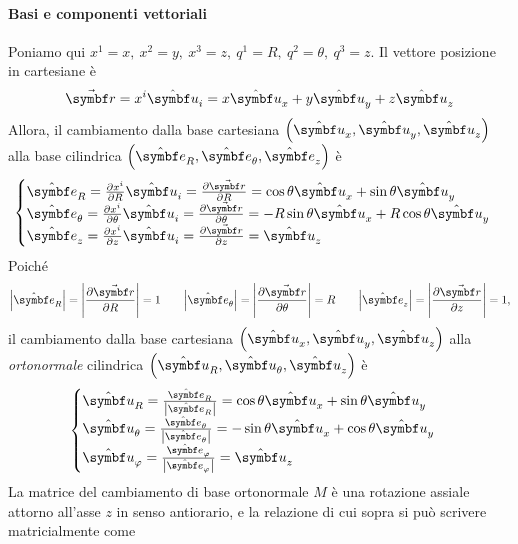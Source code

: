 \paragraph{Basi e componenti vettoriali}
Poniamo qui $x^1=x,\ x^2=y,\ x^3=z,\ q^1=R,\ q^2=\theta,\ q^3=z$.
Il vettore posizione in cartesiane è
\begin{equation*}
	\vba{r}=x^i\vbh{u}_i=x\vbh{u}_x+y\vbh{u}_y+z\vbh{u}_z
\end{equation*}
Allora, il cambiamento dalla base cartesiana $\left(\vbh{u}_x,\vbh{u}_y,\vbh{u}_z\right)$ alla base cilindrica $\left(\vbh{e}_R,\vbh{e}_\theta,\vbh{e}_z\right)$ è
\begin{equation}
	\begin{cases}
		\vbh{e}_R=\pdv{x^i}{R}\vbh{u}_i=\pdv{\vba{r}}{R}=\cos\theta\vbh{u}_x+\sin\theta\vbh{u}_y\\
		\vbh{e}_\theta=\pdv{x^i}{\theta}\vbh{u}_i=\pdv{\vba{r}}{\theta}=-R\sin\theta\vbh{u}_x+R\cos\theta\vbh{u}_y\\
		\vbh{e}_z=\pdv{x^i}{z}\vbh{u}_i=\pdv{\vba{r}}{z}=\vbh{u}_z
	\end{cases}
\end{equation}
Poiché
\begin{equation}
	\abs{\vbh{e}_R}=\abs{\pdv{\vba{r}}{R}}=1\qquad\abs{\vbh{e}_\theta}=\abs{\pdv{\vba{r}}{\theta}}=R\qquad\abs{\vbh{e}_z}=\abs{\pdv{\vba{r}}{z}}=1,
\end{equation}
il cambiamento dalla base cartesiana $\left(\vbh{u}_x,\vbh{u}_y,\vbh{u}_z\right)$ alla \textit{ortonormale} cilindrica $\left(\vbh{u}_R,\vbh{u}_\theta,\vbh{u}_z\right)$ è
\begin{equation}
	\begin{cases}
		\vbh{u}_R=\frac{\vbh{e}_R}{\abs{\vbh{e}_R}}=\cos\theta\vbh{u}_x+\sin\theta\vbh{u}_y\\
		\vbh{u}_\theta=\frac{\vbh{e}_\theta}{\abs{\vbh{e}_\theta}}=-\sin\theta\vbh{u}_x+\cos\theta\vbh{u}_y\\
		\vbh{u}_\phi=\frac{\vbh{e}_\phi}{\abs{\vbh{e}_\phi}}=\vbh{u}_z
	\end{cases}
\end{equation}
La matrice del cambiamento di base ortonormale $M$ è una rotazione assiale attorno all'asse $z$ in senso antiorario, e la relazione di cui sopra si può scrivere matricialmente come
